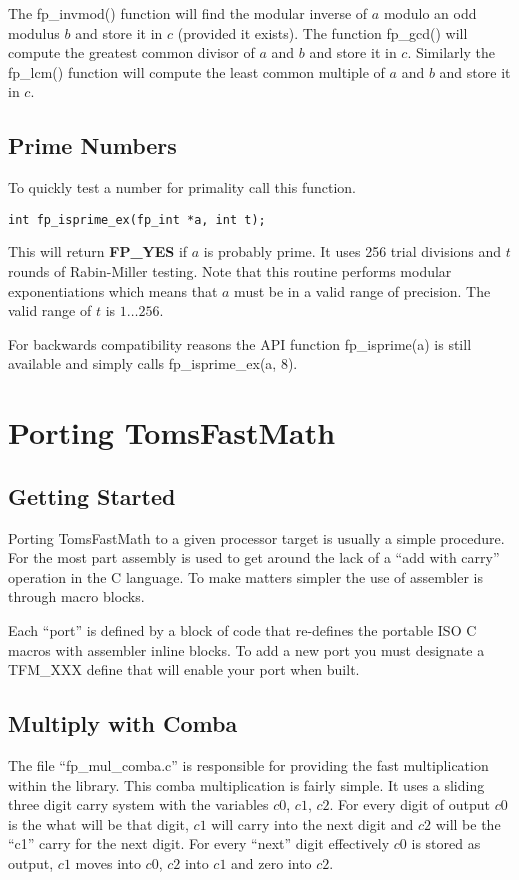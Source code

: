 \documentclass[b5paper]{book}
\begin{document}
The fp\_invmod() function will find the modular inverse of $a$ modulo an odd modulus $b$ and store
it in $c$ (provided it exists).  The function fp\_gcd() will compute the greatest common
divisor of $a$ and $b$ and store it in $c$.  Similarly the fp\_lcm() function will compute
the least common multiple of $a$ and $b$ and store it in $c$.

\section{Prime Numbers}
To quickly test a number for primality call this function.

\begin{verbatim}
int fp_isprime_ex(fp_int *a, int t);
\end{verbatim}
This will return \textbf{FP\_YES} if $a$ is probably prime.  It uses 256 trial divisions and
$t$ rounds of Rabin-Miller testing.  Note that this routine performs modular exponentiations
which means that $a$ must be in a valid range of precision.
The valid range of $t$ is $1 \ldots 256$.

For backwards compatibility reasons the API function fp\_isprime(a) is still available
and simply calls fp\_isprime\_ex(a, 8).

\chapter{Porting TomsFastMath}
\label{chap:asmops}
\section{Getting Started}
Porting TomsFastMath to a given processor target is usually a simple procedure.  For the most part 
assembly is used to get around the lack of a ``add with carry'' operation in the C language.  To
make matters simpler the use of assembler is through macro blocks.

Each ``port'' is defined by a block of code that re-defines the portable ISO C macros with assembler
inline blocks.  To add a new port you must designate a TFM\_XXX define that will enable your 
port when built.

\section{Multiply with Comba}
The file ``fp\_mul\_comba.c'' is responsible for providing the fast multiplication within the 
library.  This comba multiplication is fairly simple.  It uses a sliding three digit carry 
system with the variables $c0$, $c1$, $c2$.  For every digit of output $c0$ is the what will
be that digit, $c1$ will carry into the next digit and $c2$ will be the ``c1'' carry for
the next digit.  For every ``next'' digit effectively $c0$ is stored as output, $c1$ moves into
$c0$, $c2$ into $c1$ and zero into $c2$.
\end{document}
